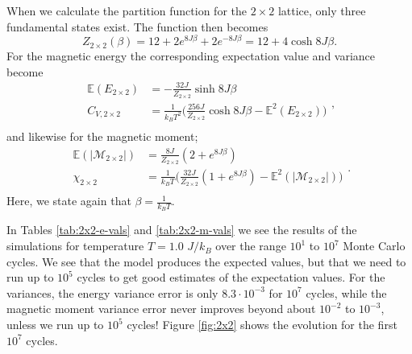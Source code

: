 \documentclass[]{article}
\begin{document}
When we calculate the partition function for the $2 \times 2$ lattice, only three fundamental states exist. The function then becomes
\begin{equation}
	Z_{2 \times 2} (\beta) = 12 + 2e^{8J \beta} + 2e^{-8J \beta} = 12 + 4\cosh 8J\beta.
\end{equation}
For the magnetic energy the corresponding expectation value and variance become
\begin{equation}
\begin{aligned}
	\mathbb{E}(E_{2 \times 2}) &= -\frac{32J}{Z_{2 \times 2}} \sinh 8J\beta \\
	C_{V, 2 \times 2} &= \frac{1}{k_B T^2} \bigg( \frac{256J}{Z_{2 \times 2}} \cosh 8J\beta - \mathbb{E}^2(E_{2 \times 2}) \bigg) \\
\end{aligned},
\end{equation}
and likewise for the magnetic moment; 
\begin{equation}
\begin{aligned}
	\mathbb{E}(|\mathcal{M}_{2 \times 2}|) &= \frac{8J}{Z_{2 \times 2}} (2 + e^{8J\beta}) \\
	\chi_{2 \times 2} &= \frac{1}{k_B T} \bigg( \frac{32J}{Z_{2 \times 2}} (1 + e^{8J\beta}) - \mathbb{E}^2(|\mathcal{M}_{2 \times 2}|) \bigg) \\
\end{aligned}.
\end{equation}
Here, we state again that $\beta = \frac{1}{k_B T}$.

In Tables \ref{tab:2x2-e-vals} and \ref{tab:2x2-m-vals} we see the results of the simulations for temperature $T=1.0$ $J/k_B$ over the range $10^1$ to $10^7$ Monte Carlo cycles. We see that the model produces the expected values, but that we need to run up to $10^5$ cycles to get good estimates of the expectation values. For the variances, the energy variance error is only $8.3 \cdot 10^{-3}$ for $10^7$ cycles, while the magnetic moment variance error never improves beyond about $10^{-2}$ to $10^{-3}$, unless we run up to $10^5$ cycles! Figure \ref{fig:2x2} shows the evolution for the first $10^7$ cycles.
\end{document}

